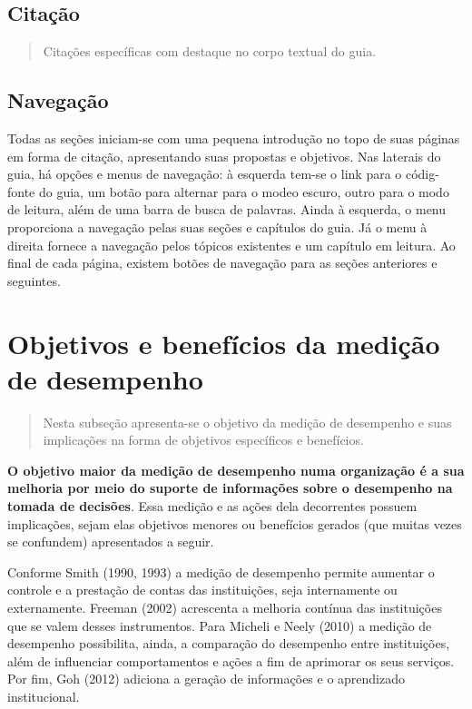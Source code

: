 \documentclass[
  letterpaper,
  DIV=11,
  numbers=noendperiod]{scrreprt}
\begin{document}
\hypertarget{citauxe7uxe3o}{%
\section{Citação}\label{citauxe7uxe3o}}

\begin{quote}
Citações específicas com destaque no corpo textual do guia.
\end{quote}

\hypertarget{navegauxe7uxe3o}{%
\section{Navegação}\label{navegauxe7uxe3o}}

Todas as seções iniciam-se com uma pequena introdução no topo de suas
páginas em forma de citação, apresentando suas propostas e objetivos.
Nas laterais do guia, há opções e menus de navegação: à esquerda tem-se
o link para o códig-fonte do guia, um botão para alternar para o modeo
escuro, outro para o modo de leitura, além de uma barra de busca de
palavras. Ainda à esquerda, o menu proporciona a navegação pelas suas
seções e capítulos do guia. Já o menu à direita fornece a navegação
pelos tópicos existentes e um capítulo em leitura. Ao final de cada
página, existem botões de navegação para as seções anteriores e
seguintes.

\hypertarget{objetivos-e-benefuxedcios-da-mediuxe7uxe3o-de-desempenho}{%
\chapter{Objetivos e benefícios da medição de
desempenho}\label{objetivos-e-benefuxedcios-da-mediuxe7uxe3o-de-desempenho}}

\begin{quote}
Nesta subseção apresenta-se o objetivo da medição de desempenho e suas
implicações na forma de objetivos específicos e benefícios.
\end{quote}

\textbf{O objetivo maior da medição de desempenho numa organização é a
sua melhoria por meio do suporte de informações sobre o desempenho na
tomada de decisões}. Essa medição e as ações dela decorrentes possuem
implicações, sejam elas objetivos menores ou benefícios gerados (que
muitas vezes se confundem) apresentados a seguir.

Conforme Smith (1990, 1993) a medição de desempenho permite aumentar o
controle e a prestação de contas das instituições, seja internamente ou
externamente. Freeman (2002) acrescenta a melhoria contínua das
instituições que se valem desses instrumentos. Para Micheli e Neely
(2010) a medição de desempenho possibilita, ainda, a comparação do
desempenho entre instituições, além de influenciar comportamentos e
ações a fim de aprimorar os seus serviços. Por fim, Goh (2012) adiciona
a geração de informações e o aprendizado institucional.
\end{document}
